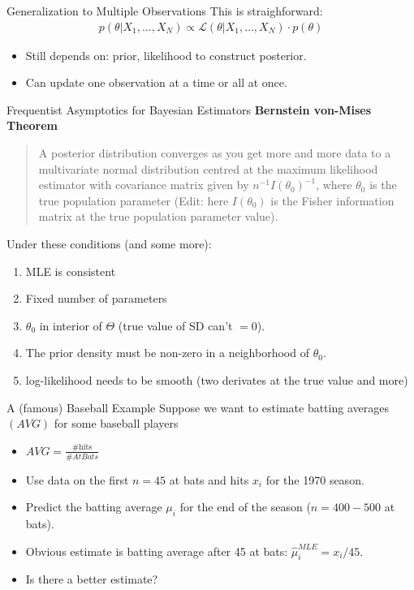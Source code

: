\documentclass[aspectratio=169]{beamer}
\begin{document}
\begin{frame}{Generalization to Multiple Observations}
This is straighforward:
\begin{align*}
p(\theta | X_{1}, \ldots, X_{N}) \propto \mathcal{L}(\theta | X_{1}, \ldots, X_{N}) \cdot p(\theta)
\end{align*}
\begin{itemize}
\item Still depends on: \alert{prior}, \alert{likelihood} to construct \alert{posterior}.
\item Can update one observation at a time or all at once.
\end{itemize}
\end{frame}

\begin{frame}{Frequentist Asymptotics for Bayesian Estimators}
\textbf{Bernstein von-Mises Theorem}
\begin{quote}
A posterior distribution converges as you get more and more data to a multivariate normal distribution centred at the maximum likelihood estimator with covariance matrix given by $n^{-1} I(\theta_0)^{-1}$, where $\theta_0$ is the true population parameter (Edit: here $I(\theta_0)$ is the Fisher information matrix at the true population parameter value).
\end{quote}
Under these conditions (and some more):
\begin{enumerate}
\item MLE is consistent
\item Fixed number of parameters
\item $\theta_0$ in interior of $\Theta$ (true value of SD can't $=0$).
\item The prior density must be non-zero in a neighborhood of $\theta_0$.
\item  log-likelihood needs to be smooth (two derivates at the true value and more)
\end{enumerate}
\end{frame}


\begin{frame}[fragile]{A (famous) Baseball Example}
Suppose we want to estimate batting averages $(AVG)$ for some baseball players
\begin{itemize}
\item $AVG = \frac{\# \text{hits}}{ \# At Bats}$
\item Use data on the first $n=45$ at bats and hits $x_i$ for the 1970 season.
\item Predict the batting average $\mu_i$ for the end of the season  ($n=400-500$ at bats).
\item Obvious estimate is batting average after 45 at bats: $\widehat{\mu}_i^{MLE}= x_i/45$.
\item Is there a better estimate?
\end{itemize}
\end{frame}
\end{document}
